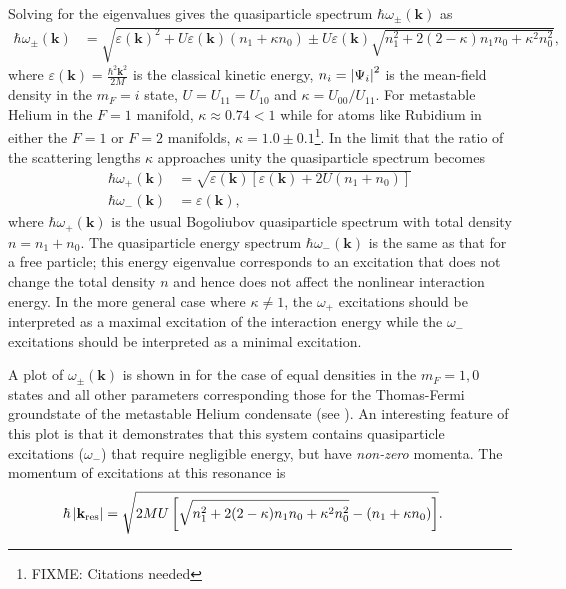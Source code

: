 Solving for the eigenvalues gives the quasiparticle spectrum $\hbar \omega_\pm(\mathbf{k})$ as
\begin{align}
    \hbar \omega_\pm(\mathbf{k}) &= \sqrt{\varepsilon(\mathbf{k})^2 + U \varepsilon(\mathbf{k}) (n_1 + \kappa n_0) \pm U \varepsilon(\mathbf{k})\sqrt{n_1^2 + 2 (2 - \kappa) n_1 n_0 + \kappa^2 n_0^2} },
    \label{Peaks:QuasiparticleSpectrum}
\end{align}
where $\displaystyle\varepsilon(\mathbf{k}) = \frac{\hbar^2 \mathbf{k}^2}{2M}$ is the classical kinetic energy, $n_i=\left|\Psi_i\right|^2$ is the mean-field density in the $m_F=i$ state, $U = U_{11} = U_{10}$ and $\kappa = U_{00}/U_{11}$. For metastable Helium in the $F=1$ manifold, $\kappa \approx 0.74 < 1$ while for atoms like Rubidium in either the $F=1$ or $F=2$ manifolds, $\kappa = 1.0 \pm 0.1$\footnote{FIXME: Citations needed}.  In the limit that the ratio of the scattering lengths $\kappa$ approaches unity the quasiparticle spectrum becomes
\begin{align}
    \hbar \omega_+(\mathbf{k}) &= \sqrt{\varepsilon(\mathbf{k})\left[\varepsilon(\mathbf{k}) + 2 U (n_1 + n_0) \right]} \label{Peaks:EPlusSimple}\\
    \hbar \omega_-(\mathbf{k}) &= \varepsilon(\mathbf{k}), \label{Peaks:EMinusSimple}
\end{align}
where $\hbar \omega_+(\mathbf{k})$ is the usual Bogoliubov quasiparticle spectrum \citep{Bogoliubov:1947} with total density $n = n_1 + n_0$. The quasiparticle energy spectrum $\hbar \omega_-(\mathbf{k})$ is the same as that for a free particle; this energy eigenvalue corresponds to an excitation that does not change the total density $n$ and hence does not affect the nonlinear interaction energy. In the more general case where $\kappa \neq 1$, the $\omega_+$ excitations should be interpreted as a maximal excitation of the interaction energy while the $\omega_-$ excitations should be interpreted as a minimal excitation.

A plot of $\omega_\pm(\mathbf{k})$ is shown in  for the case of equal densities in the $m_F=1, 0$ states and all other parameters corresponding those for the Thomas-Fermi groundstate of the metastable Helium condensate (see ). An interesting feature of this plot is that it demonstrates that this system contains quasiparticle excitations ($\omega_-$) that require negligible energy, but have \emph{non-zero} momenta. The momentum of excitations at this resonance is
\begin{align}
    \hbar \abs{\mathbf{k}_\text{res}} &= \sqrt{2 M U \left[\sqrt{n_1^2 + 2(2 - \kappa)n_1 n_0 + \kappa^2 n_0^2} - (n_1 + \kappa n_0)\right]}. \label{Peaks:BogResonantWavenumber}
\end{align}


